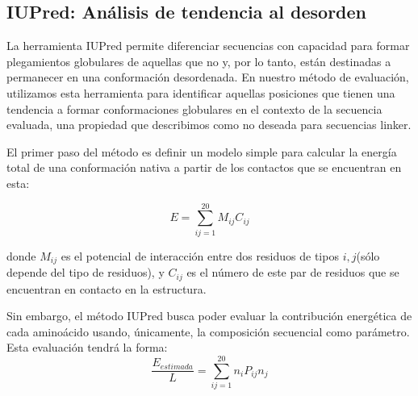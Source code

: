 \subsection{IUPred: Análisis de tendencia al desorden} \label{iupred}

La herramienta IUPred\cite{dosztanyi2005pairwise} permite diferenciar secuencias con capacidad para formar plegamientos globulares de aquellas que no y, por lo tanto, están destinadas a permanecer en una conformación desordenada.
En nuestro método de evaluación, utilizamos esta herramienta para identificar aquellas posiciones que tienen una tendencia a formar conformaciones globulares en el contexto de la secuencia evaluada,
una propiedad que describimos como no deseada para secuencias linker.





El primer paso del método es definir un modelo simple para calcular la energía total de una conformación nativa a partir de los contactos que se encuentran en esta:

\begin{equation}\label{modelo1}
E = \sum_{ij=1}^{20} M_{ij}C_{ij}
\end{equation}

\noindent donde $M_{ij}$ es el potencial de interacción entre dos residuos de tipos $i,j$(sólo depende del tipo de residuos), y $C_{ij}$ es el número de este par de residuos que se encuentran en contacto en la estructura.

Sin embargo, el método IUPred busca poder evaluar la contribución energética de cada aminoácido usando, únicamente, la composición secuencial como parámetro. 
Esta evaluación tendrá la forma: 
\begin{equation}\label{modelo2}
\frac{E_{estimada}}{L} = \sum_{ij=1}^{20} n_{i}P_{ij}n_{j}
\end{equation}

